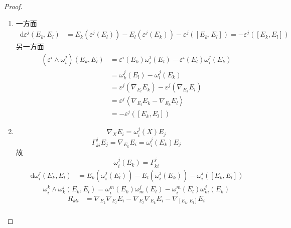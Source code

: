 \documentclass[../../main.tex]{subfiles}
\begin{document}
\begin{proof}
    \begin{enumerate}
        \item 一方面 \[
    \begin{aligned}
    \,\mathrm{d}  \varepsilon ^{j}\left( E_{k},E_{l} \right)&=   E_{k}\left(  \varepsilon ^{j}\left( E_{l} \right)  \right)- E_{l}\left(  \varepsilon ^{j}\left( E_{k} \right)  \right) - \varepsilon ^{j}\left( \left[ E_{k},E_{l} \right]  \right) = - \varepsilon ^{j}\left( \left[ E_{k},E_{l} \right]  \right) 
    \end{aligned}
    \] 另一方面 \[
    \begin{aligned}
 \left(     \varepsilon ^{i}\wedge  \omega _{i}^{j}\right)\left( E_{k},E_{l} \right)&=    \varepsilon ^{i}\left( E_{k} \right) \omega _{i}^{j}\left( E_{l} \right)-  \varepsilon  ^{i}\left( E_{l} \right) \omega _{i}^{j}\left( E_{k} \right)\\ 
  &=  \omega _{k}^{j}\left( E_{l} \right)- \omega _{l}^{j}  \left( E_{k} \right)     \\ 
   &=  \varepsilon ^{j}\left(  \nabla _{E_{l}} E_{k}\right)- \varepsilon ^{j}\left(  \nabla _{E_{k}}E_{l} \right)\\ 
    &=  \varepsilon ^{j}\left<  \nabla _{E_{l}}E_{k}- \nabla _{E_{k}}E_{l} \right>  \\ 
     &= - \varepsilon ^{j}\left( \left[ E_{k},E_{l} \right]  \right) 
    \end{aligned}
    \]
    \item  \[
   \nabla _{X}E_{i}=  \omega _{i}^{j}\left( X \right)E_{j} 
  \]  \[
   \Gamma _{ki}^{j}E_{j}=  \nabla _{E_{k}}E_{i}=  \omega _{i}^{j}\left( E_{k} \right)E_{j} 
  \]故 \[
   \omega _{i}^{j}\left( E_{k} \right)=  \Gamma _{ki}^{j} 
  \] \[
 \begin{aligned}
 \,\mathrm{d}  \omega _{i}^{j}\left( E_{k},E_{l} \right)&=  E_{k}\left(  \omega _{i}^{j}\left( E_{l} \right)  \right)-E_{l}\left(  \omega _{i}^{j}\left( E_{k} \right)  \right)- \omega _{i}^{j}\left( \left[ E_{k},E_{l} \right]  \right)   
 \end{aligned}
  \]\[
   \omega _{i}^{k}\wedge  \omega _{k}^{j}\left( E_{k},E_{l} \right)= \omega _{i}^{m}\left( E_{k} \right) \omega _{m}^{j}\left( E_{l} \right)   - \omega _{i}^{m}\left( E_{l} \right)  \omega _{m}^{j}\left( E_{k} \right) 
  \]\[
  \begin{aligned}
  R_{kli}&=  \nabla _{E_{k}}  \nabla _{E_{l}}E_{i}- \nabla _{E_{l}} \nabla _{E_{k}}E_{i}- \nabla _{\left[ E_{k},E_{l} \right] }E_{i}\\ 

\end{aligned}\]
\end{enumerate}
\end{proof}
\end{document}
